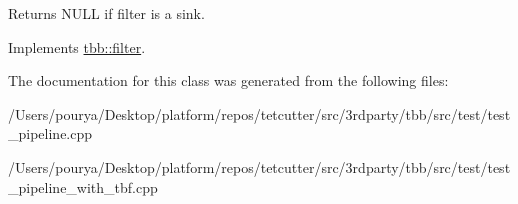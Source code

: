 Returns N\+U\+L\+L if filter is a sink. 

Implements \hyperlink{classtbb_1_1filter_a04b442ece10fd08f98d098ed5d0cbe35}{tbb\+::filter}.



The documentation for this class was generated from the following files\+:\begin{DoxyCompactItemize}
\item 
/\+Users/pourya/\+Desktop/platform/repos/tetcutter/src/3rdparty/tbb/src/test/test\+\_\+pipeline.\+cpp\item 
/\+Users/pourya/\+Desktop/platform/repos/tetcutter/src/3rdparty/tbb/src/test/test\+\_\+pipeline\+\_\+with\+\_\+tbf.\+cpp\end{DoxyCompactItemize}
